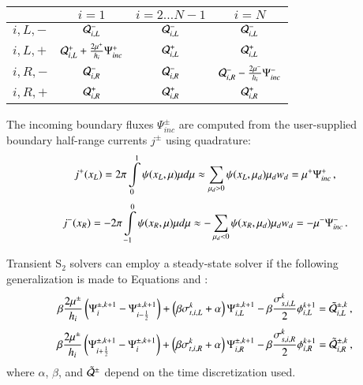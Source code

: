 \documentclass[preprint,12pt]{elsarticle}
\begin{document}
\begin{center}
\begin{tabular}{|l||c|c|c|}\hline
          & $i=1$ & $i=2\ldots N-1$ & $i=N$\\\hline\hline
  $i,L,-$ & $\mathcal{Q}^-_{i,L}$
          & $\mathcal{Q}^-_{i,L}$
          & $\mathcal{Q}^-_{i,L}$ \\\hline
  $i,L,+$ & $\mathcal{Q}^+_{i,L} + \frac{2\mu^+}{h_i}\Psi^+_{inc}$
          & $\mathcal{Q}^+_{i,L}$
          & $\mathcal{Q}^+_{i,L}$ \\\hline
  $i,R,-$ & $\mathcal{Q}^-_{i,R}$
          & $\mathcal{Q}^-_{i,R}$
          & $\mathcal{Q}^-_{i,R} - \frac{2\mu^-}{h_i}\Psi^-_{inc}$ \\\hline
  $i,R,+$ & $\mathcal{Q}^+_{i,R}$
          & $\mathcal{Q}^+_{i,R}$
          & $\mathcal{Q}^+_{i,R}$ \\\hline
\end{tabular}
\end{center}
The incoming boundary fluxes $\Psi^\pm_{inc}$ are computed from the
user-supplied boundary half-range currents $j^\pm$ using quadrature:
\begin{equation}
   j^+(x_L) = 2\pi\int\limits_0^1 \psi(x_L,\mu)\mu d\mu
   \approx \sum\limits_{\mu_d>0}\psi(x_L,\mu_d)\mu_d w_d
   = \mu^+\Psi^+_{inc} \, ,
\end{equation}
\begin{equation}
   j^-(x_R) = -2\pi\int\limits_{-1}^0 \psi(x_R,\mu)\mu d\mu
   \approx -\sum\limits_{\mu_d<0}\psi(x_R,\mu_d)\mu_d w_d
   = -\mu^-\Psi^-_{inc} \, .
\end{equation}

Transient S$_2$ solvers can employ a steady-state solver if
the following generalization is made to Equations 
and :
\begin{equation}\lequ{S2trL}
  \beta\frac{2\mu^\pm}{h_i}\fn{\Psi^{\pm,k+1}_i - \Psi^{\pm,k+1}_{i-\half}}
  +\fn{\beta\sigma_{t,i,L}^k + \alpha}\Psi\iL^{\pm,k+1}
  -\beta\frac{\sigma_{s,i,L}^k}{2}\phi\iL^{k+1}
  =\tilde{\Q}_{i,L}^{\pm,k} \pec
\end{equation}
\begin{equation}\lequ{S2trR}
  \beta\frac{2\mu^\pm}{h_i}\fn{\Psi^{\pm,k+1}_{i+\half} - \Psi^{\pm,k+1}_i}
  +\fn{\beta\sigma_{t,i,R}^k + \alpha}\Psi\iR^{\pm,k+1}
  -\beta\frac{\sigma_{s,i,R}^k}{2}\phi\iR^{k+1}
  =\tilde{\Q}_{i,R}^{\pm,k} \pec
\end{equation}
where $\alpha$, $\beta$, and $\tilde{\mathcal{Q}}^\pm$ depend on the time
discretization used.
\end{document}
